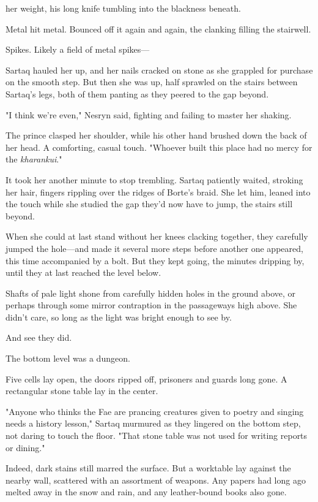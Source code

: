 her weight, his long knife tumbling into the blackness beneath.

Metal hit metal. Bounced off it again and again, the clanking filling the stairwell.

Spikes. Likely a field of metal spikes---

Sartaq hauled her up, and her nails cracked on stone as she grappled for purchase on the smooth step. But then she was up, half sprawled on the stairs between Sartaq's legs, both of them panting as they peered to the gap beyond.

"I think we're even," Nesryn said, fighting and failing to master her shaking.

The prince clasped her shoulder, while his other hand brushed down the back of her head. A comforting, casual touch. "Whoever built this place had no mercy for the \emph{kharankui}."

It took her another minute to stop trembling. Sartaq patiently waited, stroking her hair, fingers rippling over the ridges of Borte's braid. She let him, leaned into the touch while she studied the gap they'd now have to jump, the stairs still beyond.

When she could at last stand without her knees clacking together, they carefully jumped the hole---and made it several more steps before another one appeared, this time accompanied by a bolt. But they kept going, the minutes dripping by, until they at last reached the level below.

Shafts of pale light shone from carefully hidden holes in the ground above, or perhaps through some mirror contraption in the passageways high above. She didn't care, so long as the light was bright enough to see by.

And see they did.

The bottom level was a dungeon.

Five cells lay open, the doors ripped off, prisoners and guards long gone. A rectangular stone table lay in the center.

"Anyone who thinks the Fae are prancing creatures given to poetry and singing needs a history lesson," Sartaq murmured as they lingered on the bottom step, not daring to touch the floor. "That stone table was not used for writing reports or dining."

Indeed, dark stains still marred the surface. But a worktable lay against the nearby wall, scattered with an assortment of weapons. Any papers had long ago melted away in the snow and rain, and any leather-bound books  also gone.

